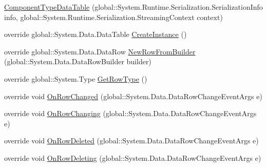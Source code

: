 \begin{DoxyCompactItemize}
\item 
\hyperlink{class_env_int_1_1_win32_1_1_field_tech_1_1_manager_1_1_data_sets_1_1_guide_ware_mobile_data_set_1_1_component_type_data_table_a997188bc3690b1470f36e4fd3ff68cd6}{Component\+Type\+Data\+Table} (global\+::\+System.\+Runtime.\+Serialization.\+Serialization\+Info info, global\+::\+System.\+Runtime.\+Serialization.\+Streaming\+Context context)
\item 
override global\+::\+System.\+Data.\+Data\+Table \hyperlink{class_env_int_1_1_win32_1_1_field_tech_1_1_manager_1_1_data_sets_1_1_guide_ware_mobile_data_set_1_1_component_type_data_table_a23faa4dbd2be8115644265331225719d}{Create\+Instance} ()
\item 
override global\+::\+System.\+Data.\+Data\+Row \hyperlink{class_env_int_1_1_win32_1_1_field_tech_1_1_manager_1_1_data_sets_1_1_guide_ware_mobile_data_set_1_1_component_type_data_table_ab70cd74f21544e385ea5ab38df6307e2}{New\+Row\+From\+Builder} (global\+::\+System.\+Data.\+Data\+Row\+Builder builder)
\item 
override global\+::\+System.\+Type \hyperlink{class_env_int_1_1_win32_1_1_field_tech_1_1_manager_1_1_data_sets_1_1_guide_ware_mobile_data_set_1_1_component_type_data_table_ade1398adf2c8c5143d6122d3432b7eb8}{Get\+Row\+Type} ()
\item 
override void \hyperlink{class_env_int_1_1_win32_1_1_field_tech_1_1_manager_1_1_data_sets_1_1_guide_ware_mobile_data_set_1_1_component_type_data_table_ad2db9b3a5d8c4e8195a08f8fd35b8ceb}{On\+Row\+Changed} (global\+::\+System.\+Data.\+Data\+Row\+Change\+Event\+Args e)
\item 
override void \hyperlink{class_env_int_1_1_win32_1_1_field_tech_1_1_manager_1_1_data_sets_1_1_guide_ware_mobile_data_set_1_1_component_type_data_table_a930e736ee3c91a992662e2a7b4faaa50}{On\+Row\+Changing} (global\+::\+System.\+Data.\+Data\+Row\+Change\+Event\+Args e)
\item 
override void \hyperlink{class_env_int_1_1_win32_1_1_field_tech_1_1_manager_1_1_data_sets_1_1_guide_ware_mobile_data_set_1_1_component_type_data_table_a5118a210129a589c1233864ed2ef9db6}{On\+Row\+Deleted} (global\+::\+System.\+Data.\+Data\+Row\+Change\+Event\+Args e)
\item 
override void \hyperlink{class_env_int_1_1_win32_1_1_field_tech_1_1_manager_1_1_data_sets_1_1_guide_ware_mobile_data_set_1_1_component_type_data_table_a8bd19d7ea77efed6555b2115eab51bf0}{On\+Row\+Deleting} (global\+::\+System.\+Data.\+Data\+Row\+Change\+Event\+Args e)
\item 

\end{DoxyCompactItemize}
